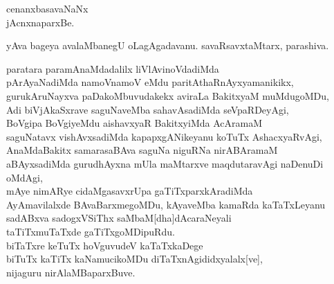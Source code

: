 \begin{entry}
\gl{}
\begin{shl}
cenanxbasavaNaNx\\
jAcnxnaparxBe.
\end{shl}
\begin{shl}
yAva bageya avalaMbanegU oLagAgadavanu. savaRsavxtaMtarx, parashiva.
\end{shl}
\begin{shl}
paratara paramAnaMdadalilx liVlAvinoVdadiMda\\
pArAyaNadiMda namoVnamoV eMdu paritAthaRnAyxyamanikikx,\\
gurukAruNayxva paDakoMbuvudakekx aviraLa BakitxyaM muMdugoMDu,\\
Adi biVjAkaSxrave saguNaveMba sahavAsadiMda seVpaRDeyAgi,\\
BoVgipa BoVgiyeMdu aishavxyaR BakitxyiMda AcAramaM\\
saguNatavx vishAvxsadiMda kapapxgANikeyanu koTuTx AshacxyaRvAgi,\\
AnaMdaBakitx samarasaBAva saguNa niguRNa nirABAramaM\\
aBAyxsadiMda gurudhAyxna mUla maMtarxve maqdutaravAgi naDenuDi oMdAgi,\\
mAye nimARye cidaMgasavxrUpa gaTiTxparxkAradiMda\\
AyAmavilalxde BAvaBarxmegoMDu, kAyaveMba kamaRda kaTaTxLeyanu\\
sadABxva sadogxVSiThx saMbaM[dha]dAcaraNeyali\\
taTiTxmuTaTxde gaTiTxgoMDipuRdu.\\
biTaTxre keTuTx hoVguvudeV kaTaTxkaDege\\
biTuTx kaTiTx kaNamucikoMDu diTaTxnAgididxyalalx[ve],\\
nijaguru nirAlaMBaparxBuve.
\end{shl}
\end{entry}

